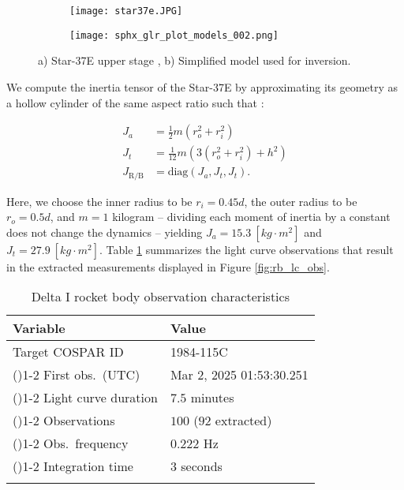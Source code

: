 \documentclass[a4paper,twocolumn]{spaceDebrisC} %
\newcommand{\grule}[0]{\arrayrulecolor{darkgray}\cmidrule(){1-2}}
\newcommand{\brule}[0]{\arrayrulecolor{black} \bottomrule}
\begin{document}
\begin{figure}[H]
  \centering
  \begin{subfigure}[b]{0.13\textwidth}
    \centering
    \texttt{[image: star37e.JPG]}
    \caption{} 
    \label{fig:star37e}
  \end{subfigure}
  \hfill
  \begin{subfigure}[b]{0.32\textwidth}
    \centering
    \texttt{[image: sphx\_glr\_plot\_models\_002.png]}
    \caption{}
    \label{fig:star37e_simple}
  \end{subfigure}
  \caption{a) Star-37E upper stage \cite{star37_af}, b) Simplified model used for inversion.}
  \label{fig:star37e_combined}
\end{figure}

We compute the inertia tensor of the Star-37E by approximating its geometry as a hollow cylinder of the same aspect ratio such that \cite{serway2019}:

\begin{align}
 J_a &= \frac{1}{2} m \left(r_o^2+r_i^2\right) \\
 J_t &= \frac{1}{12} m \left(3 \left(r_o^2+r_i^2\right) + h^2\right) \\
 J_\text{R/B} &= \text{diag} \left(J_a, J_t, J_t\right).
\end{align}

Here, we choose the inner radius to be $r_i=0.45d$, the outer radius to be $r_o=0.5d$, and $m=1$ kilogram -- dividing each moment of inertia by a constant does not change the dynamics -- yielding $J_a = 15.3 \: [kg \cdot m^2]$ and $J_t = 27.9 \: [kg \cdot m^2]$. Table \ref{tb:case2_in} summarizes the light curve observations that result in the extracted measurements displayed in Figure \ref{fig:rb_lc_obs}.

\begin{table}[H]
  \centering
  \renewcommand{\arraystretch}{1.2} 
  \caption{Delta I rocket body observation characteristics}
  \vspace*{6pt}
  \begin{tabular}{@{} l l @{}}
    \toprule
 Variable & Value \\ \midrule
 Target COSPAR ID & 1984-115C \\ \grule
 First obs.\ (UTC) & Mar 2, 2025 01:53:30.251 \\ \grule
 Light curve duration & $7.5$ minutes \\ \grule
 Observations & $100$ ($92$ extracted) \\ \grule
 Obs.\ frequency & $0.222$ Hz \\ \grule
 Integration time & $3$ seconds \\ \brule
  \end{tabular}
  \label{tb:case2_in}
\end{table}
\end{document}
